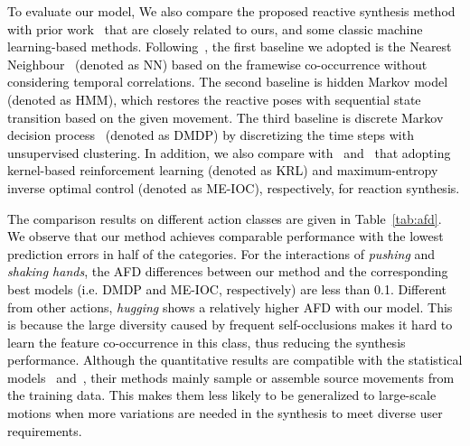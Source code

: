 \documentclass[times,twocolumn,final]{elsarticle}
\begin{document}
\begin{comment}
\begin{figure}
\centering\texttt{[image: images/compareAFD\_SBU.pdf]}
\caption{AFD with different loss terms on SBU dataset.}
\label{fig:5} 
\end{figure}
\end{comment}

\textcolor{black}{To evaluate our model, We also compare the proposed reactive synthesis method with prior work~\cite{huang2014action,huang2015approximate} that are closely related to ours, and some classic machine learning-based methods. Following~\cite{huang2015approximate}, the first baseline we adopted is the Nearest Neighbour~\cite{cover1967nearest} (denoted as NN) based on the framewise co-occurrence without considering temporal correlations. The second baseline is hidden Markov model~\cite{rabiner1986introduction} (denoted as HMM), which restores the reactive poses with sequential state transition based on the given movement. The third baseline is discrete Markov decision process~\cite{kitani2012activity} (denoted as DMDP) by discretizing the time steps with unsupervised clustering. In addition, we also compare with~\cite{huang2014action} and~\cite{huang2015approximate} that adopting kernel-based reinforcement learning (denoted as KRL) and maximum-entropy inverse optimal control (denoted as ME-IOC), respectively, for reaction synthesis.}

\textcolor{black}{The comparison results on different action classes are given in Table~\ref{tab:afd}. We observe that our method achieves comparable performance with the lowest prediction errors in half of the categories. For the interactions of \emph{pushing} and \emph{shaking hands}, the AFD differences between our method and the corresponding best models (i.e. DMDP and ME-IOC, respectively) are less than 0.1. Different from other actions, \emph{hugging} shows a relatively higher AFD with our model. This is because the large diversity caused by frequent self-occlusions makes it hard to learn the feature co-occurrence in this class, thus reducing the synthesis performance. Although the quantitative results are compatible with the statistical models~\cite{huang2014action} and~\cite{huang2015approximate}, their methods mainly sample or assemble source movements from the training data. This makes them less likely to be generalized to large-scale motions when more variations are needed in the synthesis to meet diverse user requirements.}  
\end{document}
